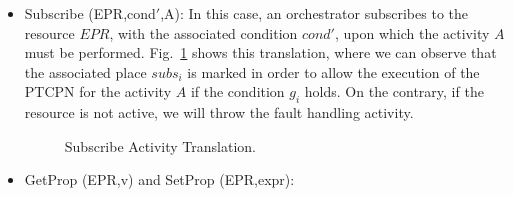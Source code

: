 \begin{itemize}
\item Subscribe (EPR,cond$'$,A):
In this case, an orchestrator subscribes to the resource $EPR$, with the associated condition $cond'$, upon which the activity $A$ must be performed. Fig.~\ref{subscribe} shows this translation, where we can observe that the associated place $subs_{i}$ is marked in order to allow the execution of the PTCPN for the activity $A$ if the condition $g_{i}$ holds. On the contrary, if the resource is not active, we will throw the fault handling activity.
\begin{figure}[!ht]
\vspace{1cm}
\begin{center}
\end{center}
\vspace{-0.7cm}
\caption{\label{subscribe} Subscribe Activity Translation.}
\vspace{-0.5cm}
\end{figure}
\newpage
\item GetProp (EPR,v) and SetProp (EPR,expr):

\end{itemize}
